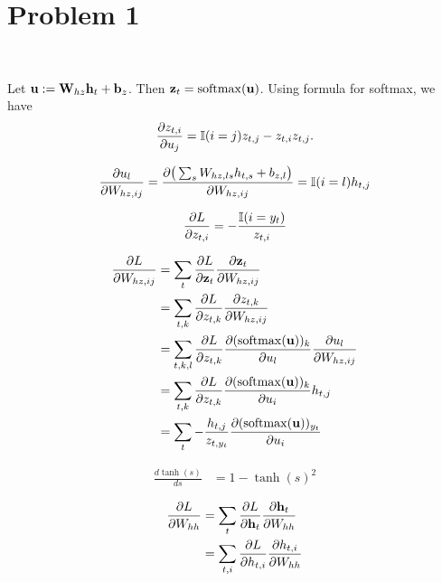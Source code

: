 \section{Problem 1}~\label{sec:prob1}

Let ${\mathbf{u}}:={\mathbf{W}}_{hz}{\mathbf{h}}_t+{\mathbf{b}}_z$.
Then ${\mathbf{z}}_t={\mathop{\mathrm{softmax}}}({\mathbf{u}})$.
Using formula for softmax, we have
\begin{equation}
    \frac{\partial z_{t,i}}{\partial u_j} = {\mathbb{I}}(i=j)z_{t,j}-z_{t,i}z_{t,j}.
\end{equation}

\begin{equation}
    \frac{\partial u_l}{\partial W_{hz,ij}}
        = \frac{\partial \big(\sum_s W_{hz,ls}h_{t,s}+b_{z,l}\big)}{\partial W_{hz,ij}}
        = {\mathbb{I}}(i=l)h_{t,j}
\end{equation}

\begin{equation}
    \frac{\partial L}{\partial z_{t,i}}= -\frac{{\mathbb{I}}(i=y_t)}{z_{t,i}}
\end{equation}

\begin{equation}
\begin{split}
    \frac{\partial L}{\partial W_{hz,ij}}
        &= \sum_t \frac{\partial L}{\partial {\mathbf{z}}_t} \frac{\partial {\mathbf{z}}_t}{\partial W_{hz,ij}} \\
        &= \sum_{t,k} \frac{\partial L}{\partial z_{t,k}} \frac{\partial z_{t,k}}{\partial W_{hz,ij}} \\
        &= \sum_{t,k,l} \frac{\partial L}{\partial z_{t,k}} \frac{\partial ({\mathop{\mathrm{softmax}}}({\mathbf{u}}))_k}{\partial u_l}\frac{\partial u_l}{\partial W_{hz,ij}} \\
        &= \sum_{t,k} \frac{\partial L}{\partial z_{t,k}} \frac{\partial ({\mathop{\mathrm{softmax}}}({\mathbf{u}}))_k}{\partial u_i}h_{t,j} \\
        &= \sum_{t} -\frac{h_{t,j}}{z_{t,y_t}} \frac{\partial ({\mathop{\mathrm{softmax}}}({\mathbf{u}}))_{y_t}}{\partial u_i} \\
\end{split}
\end{equation}

\begin{equation}
\begin{split}
    \frac{d \tanh(s)}{d s}
        &= 1 - \tanh(s)^2
\end{split}
\end{equation}

\begin{equation}
\begin{split}
    \frac{\partial L}{\partial W_{hh}}
        &= \sum_t \frac{\partial L}{\partial {\mathbf{h}}_t} \frac{\partial {\mathbf{h}}_t}{\partial W_{hh}} \\
        &= \sum_{t,i} \frac{\partial L}{\partial h_{t,i}} \frac{\partial h_{t,i}}{\partial W_{hh}} \\
\end{split}
\end{equation}
